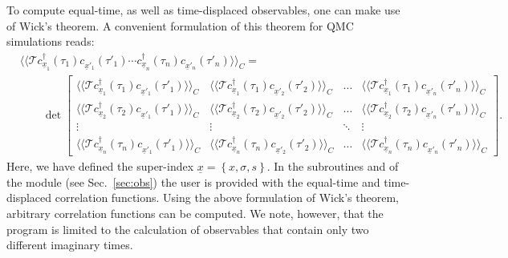 To compute equal-time, as well as time-displaced observables, one can make use of Wick's theorem. A convenient formulation of this theorem for QMC simulations reads: 
\begin{align}
&\langle \langle 	\mathcal{T}   c^{\dagger}_{\underline x_{1}}(\tau_{1}) c^{\phantom\dagger}_{{\underline x}'_{1}}(\tau'_{1})  
\cdots c^{\dagger}_{\underline x_{n}}(\tau_{n}) c^{\phantom\dagger}_{{\underline x}'_{n}}(\tau'_{n}) 
\rangle \rangle_{C} =
\nonumber \\
&\qquad\det  
\begin{bmatrix}
   \langle \langle   \mathcal{T}   c^{\dagger}_{\underline x_{1}}(\tau_{1}) c^{\phantom\dagger}_{{\underline x}'_{1}}(\tau'_{1})  \rangle \rangle_{C} & 
    \langle \langle  \mathcal{T}   c^{\dagger}_{\underline x_{1}}(\tau_{1}) c^{\phantom\dagger}_{{\underline x}'_{2}}(\tau'_{2})  \rangle \rangle_{C}  & \dots   &   
    \langle \langle   \mathcal{T}   c^{\dagger}_{\underline x_{1}}(\tau_{1}) c^{\phantom\dagger}_{{\underline x}'_{n}}(\tau'_{n})  \rangle \rangle_{C}  \\
    \langle \langle   \mathcal{T}   c^{\dagger}_{\underline x_{2}}(\tau_{2}) c^{\phantom\dagger}_{{\underline x}'_{1}}(\tau'_{1})  \rangle \rangle_{C}  & 
      \langle \langle   \mathcal{T}   c^{\dagger}_{\underline x_{2}}(\tau_{2}) c^{\phantom\dagger}_{{\underline x}'_{2}}(\tau'_{2})  \rangle \rangle_{C}  & \dots  &
       \langle \langle   \mathcal{T}   c^{\dagger}_{\underline x_{2}}(\tau_{2}) c^{\phantom\dagger}_{{\underline x}'_{n}}(\tau'_{n})  \rangle \rangle_{C}   \\
    \vdots & \vdots &  \ddots & \vdots \\
    \langle \langle   \mathcal{T}   c^{\dagger}_{\underline x_{n}}(\tau_{n}) c^{\phantom\dagger}_{{\underline x}'_{1}}(\tau'_{1})  \rangle \rangle_{C}   & 
     \langle \langle   \mathcal{T}   c^{\dagger}_{\underline x_{n}}(\tau_{n}) c^{\phantom\dagger}_{{\underline x}'_{2}}(\tau'_{2})  \rangle \rangle_{C}   & \dots  & 
     \langle \langle   \mathcal{T}   c^{\dagger}_{\underline x_{n}}(\tau_{n}) c^{\phantom\dagger}_{{\underline x}'_{n}}(\tau'_{n})  \rangle \rangle_{C}
 \end{bmatrix}.
\end{align}
Here, we have defined the super-index $\underline{ x} = \left\{   x,\sigma,s \right\}$.
In the subroutines     and  of  the module  (see Sec.~\ref{sec:obs})   the user is provided with the equal-time and time-displaced correlation functions. Using the  above  formulation  of  Wick's theorem, arbitrary  correlation functions can be computed. We note, however, that the program is limited to the calculation of observables that contain only two different imaginary times.  

